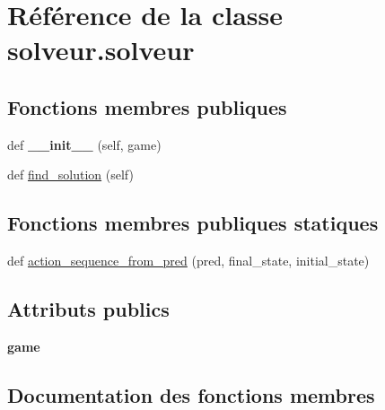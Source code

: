 \hypertarget{classsolveur_1_1solveur}{}\section{Référence de la classe solveur.\+solveur}
\label{classsolveur_1_1solveur}
\subsection*{Fonctions membres publiques}
\begin{DoxyCompactItemize}
\item 
\mbox{\label{classsolveur_1_1solveur_aaac83179919b07e763025ea73d4ccce3}} 
def {\bfseries \+\_\+\+\_\+init\+\_\+\+\_\+} (self, game)
\item 
def \hyperlink{classsolveur_1_1solveur_aae96bc7e6e7b11a51d4a55564414ba92}{find\+\_\+solution} (self)
\end{DoxyCompactItemize}
\subsection*{Fonctions membres publiques statiques}
\begin{DoxyCompactItemize}
\item 
def \hyperlink{classsolveur_1_1solveur_af3ccbdb13bf858ee950da16f2d736d52}{action\+\_\+sequence\+\_\+from\+\_\+pred} (pred, final\+\_\+state, initial\+\_\+state)
\end{DoxyCompactItemize}
\subsection*{Attributs publics}
\begin{DoxyCompactItemize}
\item 
\mbox{\label{classsolveur_1_1solveur_ad73a71390ca87152dc67d4f0855675ee}} 
{\bfseries game}
\end{DoxyCompactItemize}


\subsection{Documentation des fonctions membres}
\mbox{\label{classsolveur_1_1solveur_af3ccbdb13bf858ee950da16f2d736d52}} 

